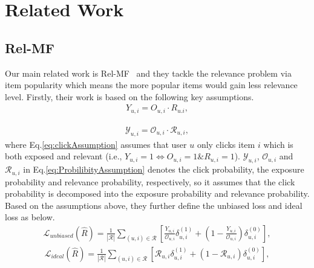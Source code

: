 \documentclass[sigconf]{acmart}
\begin{document}
	\section{Related Work}
\subsection{Rel-MF}
\label{sec:rmf}
Our main related work is Rel-MF~\cite{saito2020unbiased} and they tackle the relevance problem via item popularity which means the more popular items would gain less relevance level. Firstly, their work is based on the following key assumptions.
\begin{eqnarray}\label{eq:clickAssumption}
	Y_{u,i} = O_{u,i} \cdot R_{u.i},
\end{eqnarray}

\begin{eqnarray}\label{eq:ProbilibityAssumption}
\mathcal{Y}_{u,i}  = \mathcal{O}_{u,i} \cdot \mathcal{R}_{u,i} ,
\end{eqnarray}
where Eq.\eqref{eq:clickAssumption} assumes that user $u$ only clicks item $i$ which is both exposed and relevant (i.e., $Y_{u,i} = 1 \Leftrightarrow O_{u,i} = 1 \& R_{u,i} = 1$). $\mathcal{Y}_{u,i}$, $\mathcal{O}_{u,i}$ and $\mathcal{R}_{u,i}$ in Eq.\eqref{eq:ProbilibityAssumption} denotes the click probability, the exposure probability and relevance probability, respectively, so it assumes that the click probability is decomposed into the exposure probability and relevance probability.
Based on the assumptions above, they further define the unbiased loss and ideal loss as below.
\begin{eqnarray}\label{eq:lossUnbiased}
	\hat{\mathcal{L}}_{unbiased}(\hat{R}) = \frac{1}{|\mathcal{R}|} \sum_{(u, i) \in \mathcal{R}}^{} \left[\frac{Y_{u,i}}{ \mathcal{O}_{u,i} } \delta_{u, i}^{(1)} +\left(1 - \frac{Y_{u,i}}{\mathcal{O}_{u,i}}\right)\delta_{u, i}^{(0)} \right] ,
\end{eqnarray}
\begin{eqnarray}\label{eq:idealLoss}
	\mathcal{L}_{ideal}(\hat{R}) = \frac{1}{|\mathcal{R}|} \sum_{(u, i) \in \mathcal{R}}^{} \left[\mathcal{R}_{u,i} \delta_{u, i}^{(1)} +\left(1 - \mathcal{R}_{u,i}\right)\delta_{u, i}^{(0)} \right] ,
\end{eqnarray}
\end{document}
